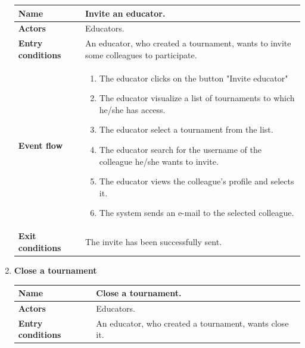 \begin{enumerate}[label=\textbf{UC.\arabic*}]
\begin{table}[H]
\begin{tabular}{|m{3.2cm}|m{9.8cm}|}
                    \hline
                    \textbf{Name} & Invite an educator. \\
                    \hline
                    \textbf{Actors} & Educators. \\
                    \hline
                    \textbf{Entry conditions}  & An educator, who created a tournament, wants to invite some colleagues to participate. \\
                    \hline
                    \textbf{Event flow}  & 
                    \begin{enumerate}[label=\arabic*.]
                        \item The educator clicks on the button "Invite educator"
                        \item The educator visualize a list of tournaments to which he/she has access.
                        \item The educator select a tournament from the list.
                        \item The educator search for the username of the colleague he/she wants to invite.
                        \item The educator views the colleague's profile and selects it.
                        \item The system sends an e-mail to the selected colleague.
                    \end{enumerate}\\
                    \hline
                    \textbf{Exit conditions}  & The invite has been successfully sent. \\
                    \hline
                \end{tabular}
        \end{table}
        \item {} \textbf{Close a tournament}
        \begin{table}[H]
    	    \centering
                \renewcommand{\arraystretch}{1.5}
                \begin{tabular}{|m{3.2cm}|m{9.8cm}|}
                    \hline
                    \textbf{Name} & Close a tournament. \\
                    \hline
                    \textbf{Actors} & Educators. \\
                    \hline
                    \textbf{Entry conditions}  &  An educator, who created a tournament, wants close it. \\
                    \hline

\end{tabular}
\end{table}
\end{enumerate}
